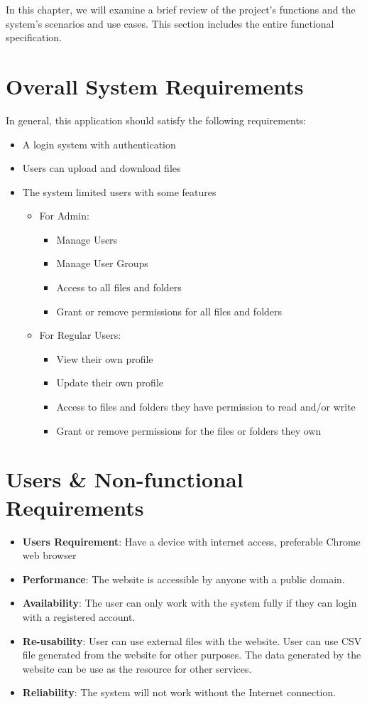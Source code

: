 In this chapter, we will examine a brief review of the project's functions and the system's scenarios and use cases. This section includes the entire functional specification.

\section{Overall System Requirements}
In general, this application should satisfy the following requirements:
\begin{itemize}
  \item A login system with authentication
  \item Users can upload and download files
  \item The system limited users with some features
  \begin{itemize}
    \item For Admin:
        \begin{itemize}
            \item Manage Users
            \item Manage User Groups
            \item Access to all files and folders
            \item Grant or remove permissions for all files and folders
        \end{itemize}
    \item For Regular Users:
        \begin{itemize}
            \item View their own profile
            \item Update their own profile
            \item Access to files and folders they have permission to read and/or write
            \item Grant or remove permissions for the files or folders they own
        \end{itemize}
  \end{itemize}
\end{itemize}

\section{Users \& Non-functional Requirements}
\begin{itemize}
    \item \textbf{Users Requirement}: Have a device with internet access, preferable Chrome web browser
    \item \textbf{Performance}: The website is accessible by anyone with a public domain. 
    \item \textbf{Availability}: The user can only work with the system fully if they can login with a registered account.
    \item \textbf{Re-usability}: User can use external files with the website. User can use CSV file generated from the website for other purposes. The data generated by the website can be use as the resource for other services.
    \item \textbf{Reliability}: The system will not work without the Internet connection.
\end{itemize}

